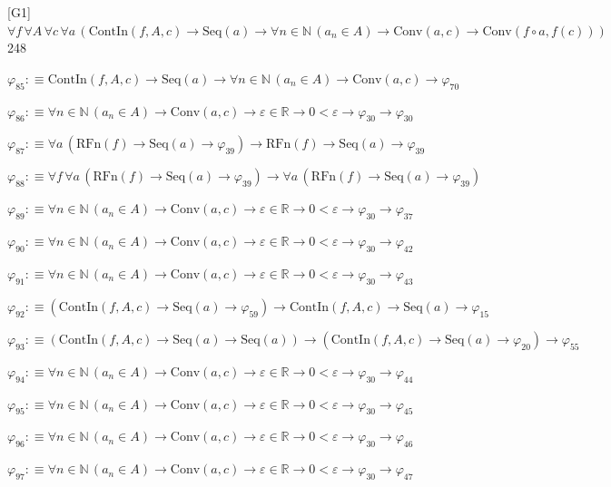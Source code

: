 \begin{fullproof}{[G1]}{$\forall f\,\forall A\,\forall c\,\forall a\,(\mathrm{ContIn}(f,A,c) \to \mathrm{Seq}(a) \to \forall n \in \mathbb{N}\,(a_{n} \in A) \to \mathrm{Conv}(a,c) \to \mathrm{Conv}(f \circ a,f(c)))$}{248}
\begin{abbrevlist}
\item $\varphi_{85} :\equiv \mathrm{ContIn}(f,A,c) \to \mathrm{Seq}(a) \to \forall n \in \mathbb{N}\,(a_{n} \in A) \to \mathrm{Conv}(a,c) \to \varphi_{70}$
\item $\varphi_{86} :\equiv \forall n \in \mathbb{N}\,(a_{n} \in A) \to \mathrm{Conv}(a,c) \to \varepsilon \in \mathbb{R} \to 0 < \varepsilon \to \varphi_{30} \to \varphi_{30}$
\item $\varphi_{87} :\equiv \forall a\,(\mathrm{RFn}(f) \to \mathrm{Seq}(a) \to \varphi_{39}) \to \mathrm{RFn}(f) \to \mathrm{Seq}(a) \to \varphi_{39}$
\item $\varphi_{88} :\equiv \forall f\,\forall a\,(\mathrm{RFn}(f) \to \mathrm{Seq}(a) \to \varphi_{39}) \to \forall a\,(\mathrm{RFn}(f) \to \mathrm{Seq}(a) \to \varphi_{39})$
\item $\varphi_{89} :\equiv \forall n \in \mathbb{N}\,(a_{n} \in A) \to \mathrm{Conv}(a,c) \to \varepsilon \in \mathbb{R} \to 0 < \varepsilon \to \varphi_{30} \to \varphi_{37}$
\item $\varphi_{90} :\equiv \forall n \in \mathbb{N}\,(a_{n} \in A) \to \mathrm{Conv}(a,c) \to \varepsilon \in \mathbb{R} \to 0 < \varepsilon \to \varphi_{30} \to \varphi_{42}$
\item $\varphi_{91} :\equiv \forall n \in \mathbb{N}\,(a_{n} \in A) \to \mathrm{Conv}(a,c) \to \varepsilon \in \mathbb{R} \to 0 < \varepsilon \to \varphi_{30} \to \varphi_{43}$
\item $\varphi_{92} :\equiv (\mathrm{ContIn}(f,A,c) \to \mathrm{Seq}(a) \to \varphi_{59}) \to \mathrm{ContIn}(f,A,c) \to \mathrm{Seq}(a) \to \varphi_{15}$
\item $\varphi_{93} :\equiv (\mathrm{ContIn}(f,A,c) \to \mathrm{Seq}(a) \to \mathrm{Seq}(a)) \to (\mathrm{ContIn}(f,A,c) \to \mathrm{Seq}(a) \to \varphi_{20}) \to \varphi_{55}$
\item $\varphi_{94} :\equiv \forall n \in \mathbb{N}\,(a_{n} \in A) \to \mathrm{Conv}(a,c) \to \varepsilon \in \mathbb{R} \to 0 < \varepsilon \to \varphi_{30} \to \varphi_{44}$
\item $\varphi_{95} :\equiv \forall n \in \mathbb{N}\,(a_{n} \in A) \to \mathrm{Conv}(a,c) \to \varepsilon \in \mathbb{R} \to 0 < \varepsilon \to \varphi_{30} \to \varphi_{45}$
\item $\varphi_{96} :\equiv \forall n \in \mathbb{N}\,(a_{n} \in A) \to \mathrm{Conv}(a,c) \to \varepsilon \in \mathbb{R} \to 0 < \varepsilon \to \varphi_{30} \to \varphi_{46}$
\item $\varphi_{97} :\equiv \forall n \in \mathbb{N}\,(a_{n} \in A) \to \mathrm{Conv}(a,c) \to \varepsilon \in \mathbb{R} \to 0 < \varepsilon \to \varphi_{30} \to \varphi_{47}$

\end{abbrevlist}
\end{fullproof}

